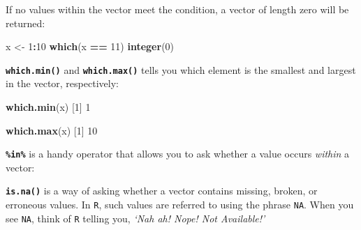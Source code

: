 \documentclass[]{book}
\newenvironment{Shaded}{\begin{snugshade}}{\end{snugshade}}
\newcommand{\DecValTok}[1]{\textcolor[rgb]{0.00,0.00,0.81}{#1}}
\newcommand{\KeywordTok}[1]{\textcolor[rgb]{0.13,0.29,0.53}{\textbf{#1}}}
\newcommand{\NormalTok}[1]{#1}
\newcommand{\OperatorTok}[1]{\textcolor[rgb]{0.81,0.36,0.00}{\textbf{#1}}}
\newcommand{\OtherTok}[1]{\textcolor[rgb]{0.56,0.35,0.01}{#1}}
\newcommand{\StringTok}[1]{\textcolor[rgb]{0.31,0.60,0.02}{#1}}
\begin{document}
If no values within the vector meet the condition, a vector of length zero will be returned:

\begin{Shaded}
\begin{Highlighting}[]
\NormalTok{x <-}\StringTok{ }\DecValTok{1}\OperatorTok{:}\DecValTok{10}
\KeywordTok{which}\NormalTok{(x }\OperatorTok{==}\StringTok{ }\DecValTok{11}\NormalTok{)}
\KeywordTok{integer}\NormalTok{(}\DecValTok{0}\NormalTok{)}
\end{Highlighting}
\end{Shaded}

\textbf{\texttt{which.min()}} and \textbf{\texttt{which.max()}} tells you which element is the smallest and largest in the vector, respectively:

\begin{Shaded}
\begin{Highlighting}[]
\KeywordTok{which.min}\NormalTok{(x)}
\NormalTok{[}\DecValTok{1}\NormalTok{] }\DecValTok{1}
\end{Highlighting}
\end{Shaded}

\begin{Shaded}
\begin{Highlighting}[]
\KeywordTok{which.max}\NormalTok{(x)}
\NormalTok{[}\DecValTok{1}\NormalTok{] }\DecValTok{10}
\end{Highlighting}
\end{Shaded}

\textbf{\texttt{\%in\%}} is a handy operator that allows you to ask whether a value occurs \emph{within} a vector:

\begin{Shaded}
\end{Shaded}

\begin{Shaded}
\end{Shaded}

\textbf{\texttt{is.na()}} is a way of asking whether a vector contains missing, broken, or erroneous values. In \texttt{R}, such values are referred to using the phrase \texttt{NA}. When you see \texttt{NA}, think of \texttt{R} telling you, \emph{`Nah ah! Nope! Not Available!'}
\end{document}
